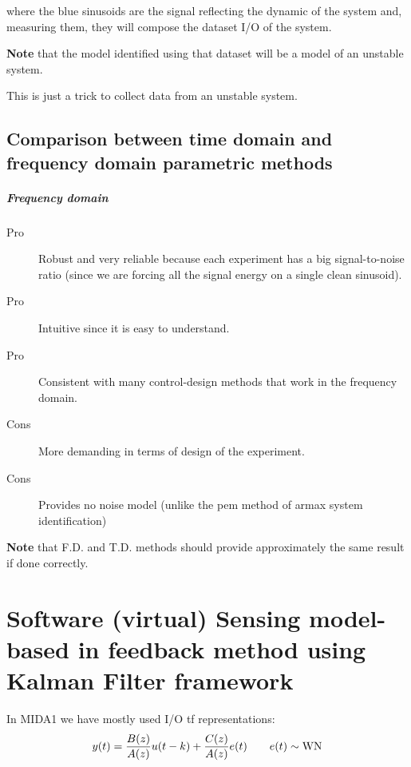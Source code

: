\begin{remark}
\begin{figure}[H]
\begin{tikzpicture}[node distance=2.5cm,auto,>=latex']
        \end{tikzpicture}
    \end{figure}
    
    where the blue sinusoids are the signal reflecting the dynamic of the system and, measuring them, they will compose the dataset I/O of the system. 
    
    \textbf{Note} that the model identified using that dataset will be a model of an unstable system.
    
    This is just a trick to collect data from an unstable system.
\end{remark}



\section{Comparison between time domain and frequency domain parametric methods}

\paragraph{Frequency domain}
\begin{description}
    \item[Pro] Robust and very reliable because each experiment has a big signal-to-noise ratio (since we are forcing all the signal energy on a single clean sinusoid).
    \item[Pro] Intuitive since it is easy to understand.
    \item[Pro] Consistent with many control-design methods that work in the frequency domain.
    \item[Cons] More demanding in terms of design of the experiment.
    \item[Cons] Provides no noise model (unlike the \gls{pem} method of \gls{armax} system identification)
    \end{description}

\textbf{Note} that F.D. and T.D. methods should provide approximately the same result if done correctly.


\chapter{Software (virtual) Sensing model-based in feedback method using Kalman Filter framework}

In MIDA1 we have mostly used I/O \acrfull{tf} representations:
\[ y(t) = \frac{B(z)}{A(z)}u(t-k) + \frac{C(z)}{A(z)}e(t) \qquad e(t) \sim \WN \]


